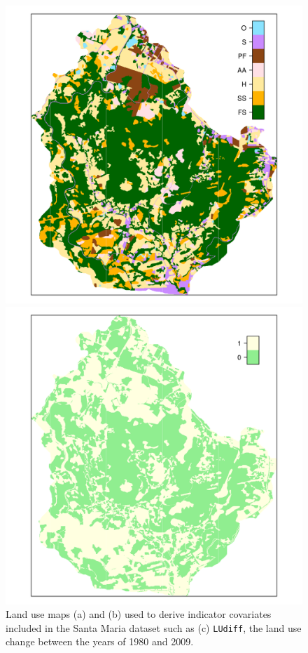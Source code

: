 \begin{figure}[!ht]
\begin{minipage}[b]{63mm}
\includegraphics{fig/chap05-land-new}
\end{minipage}
\begin{minipage}[b]{63mm}
\subcaption{}
\centering
\includegraphics{fig/chap05-land-diff}
\end{minipage}
\caption[Land use maps included in the Santa Maria dataset.]{Land use maps (a) \landOld{} and (b) \landNew{} 
used to derive indicator covariates included in the Santa Maria dataset such as (c) \texttt{LUdiff}, the land 
use change between the years of 1980 and 2009.}
\label{fig:chap05-land-use}
\end{figure}

